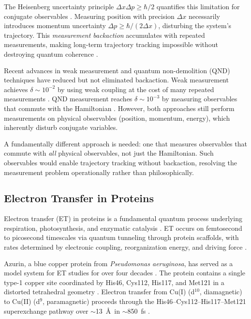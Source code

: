 \documentclass[twocolumn,10pt]{article}
\begin{document}
The Heisenberg uncertainty principle $\Delta x \Delta p \geq \hbar/2$ quantifies 
this limitation for conjugate observables \cite{Heisenberg1927}. Measuring 
position with precision $\Delta x$ necessarily introduces momentum uncertainty 
$\Delta p \geq \hbar/(2\Delta x)$, disturbing the system's trajectory. This 
\textit{measurement backaction} accumulates with repeated measurements, making 
long-term trajectory tracking impossible without destroying quantum coherence 
\cite{Braginsky1992, Clerk2010}.

Recent advances in weak measurement \cite{Aharonov1988, Wiseman2010} and quantum 
non-demolition (QND) techniques \cite{Braginsky1980, Grangier1998} have reduced 
but not eliminated backaction. Weak measurement achieves $\delta \sim 10^{-2}$ 
by using weak coupling at the cost of many repeated measurements \cite{Dressel2014}. 
QND measurement reaches $\delta \sim 10^{-3}$ by measuring observables that 
commute with the Hamiltonian \cite{Brune1990}. However, both approaches still 
perform measurements on physical observables (position, momentum, energy), which 
inherently disturb conjugate variables.

A fundamentally different approach is needed: one that measures observables 
that commute with \textit{all} physical observables, not just the Hamiltonian. 
Such observables would enable trajectory tracking without backaction, resolving 
the measurement problem operationally rather than philosophically.


\subsection{Electron Transfer in Proteins}

Electron transfer (ET) in proteins is a fundamental quantum process underlying 
respiration, photosynthesis, and enzymatic catalysis \cite{Marcus1956, 
Marcus1993}. ET occurs on femtosecond to picosecond timescales via quantum 
tunneling through protein scaffolds, with rates determined by electronic coupling, 
reorganization energy, and driving force \cite{Moser1992, Page1999}.

Azurin, a blue copper protein from \textit{Pseudomonas aeruginosa}, has served 
as a model system for ET studies for over four decades \cite{Adman1978, 
Nar1991, Crane2001}. The protein contains a single type-1 copper site coordinated 
by His46, Cys112, His117, and Met121 in a distorted tetrahedral geometry 
\cite{Adman1978}. Electron transfer from Cu(I) (d$^{10}$, diamagnetic) to 
Cu(II) (d$^9$, paramagnetic) proceeds through the His46--Cys112--His117--Met121 
superexchange pathway over $\sim$13~\AA\ in $\sim$850~fs \cite{Crane2001, 
Gray2003}.
\end{document}

